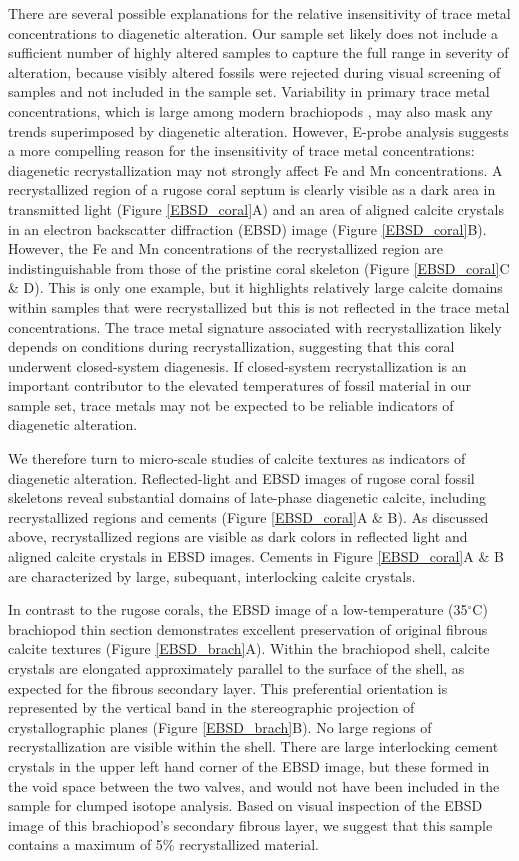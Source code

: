 \documentclass[5p, authoryear]{elsarticle}
\begin{document}
There are several possible explanations for the relative insensitivity of trace metal concentrations to diagenetic alteration. Our sample set likely does not include a sufficient number of highly altered samples to capture the full range in severity of alteration, because visibly altered fossils were rejected during visual screening of samples and not included in the sample set. Variability in primary trace metal concentrations, which is large among modern brachiopods \citep{Brand2003}, may also mask any trends superimposed by diagenetic alteration. However, E-probe analysis suggests a more compelling reason for the insensitivity of trace metal concentrations: diagenetic recrystallization may not strongly affect Fe and Mn concentrations. A recrystallized region of a rugose coral septum is clearly visible as a dark area in transmitted light (Figure \ref{EBSD_coral}A) and an area of aligned calcite crystals in an electron backscatter diffraction (EBSD) image (Figure \ref{EBSD_coral}B). However, the Fe and Mn concentrations of the recrystallized region are indistinguishable from those of the pristine coral skeleton (Figure \ref{EBSD_coral}C \& D). This is only one example, but it highlights relatively large calcite domains within samples that were recrystallized but this is not reflected in the trace metal concentrations. The trace metal signature associated with recrystallization likely depends on conditions during recrystallization, suggesting that this coral underwent closed-system diagenesis. If closed-system recrystallization is an important contributor to the elevated temperatures of fossil material in our sample set, trace metals may not be expected to be reliable indicators of diagenetic alteration. 

We therefore turn to micro-scale studies of calcite textures as indicators of diagenetic alteration. Reflected-light and EBSD images of rugose coral fossil skeletons reveal substantial domains of late-phase diagenetic calcite, including recrystallized regions and cements (Figure \ref{EBSD_coral}A \& B). As discussed above, recrystallized regions are visible as dark colors in reflected light and aligned calcite crystals in EBSD images. Cements in Figure \ref{EBSD_coral}A \& B are characterized by large, subequant, interlocking calcite crystals. 

In contrast to the rugose corals, the EBSD image of a low-temperature (35$^{\circ}$C) brachiopod thin section demonstrates excellent preservation of original fibrous calcite textures (Figure \ref{EBSD_brach}A). Within the brachiopod shell, calcite crystals are elongated approximately parallel to the surface of the shell, as expected for the fibrous secondary layer. This preferential orientation is represented by the vertical band in the stereographic projection of crystallographic planes (Figure \ref{EBSD_brach}B). No large regions of recrystallization are visible within the shell. There are large interlocking cement crystals in the upper left hand corner of the EBSD image, but these formed in the void space between the two valves, and would not have been included in the sample for clumped isotope analysis. Based on visual inspection of the EBSD image of this brachiopod's secondary fibrous layer, we suggest that this sample contains a maximum of 5\% recrystallized material. 
\end{document}
